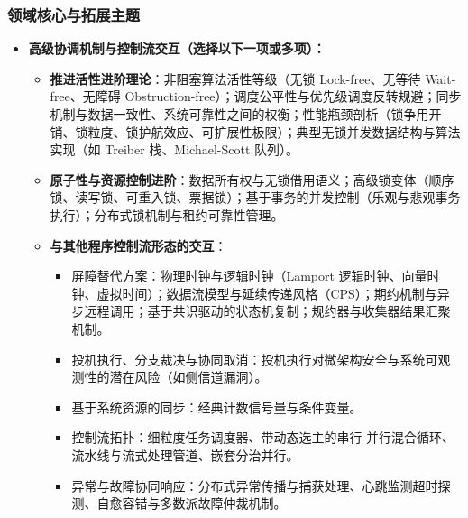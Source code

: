 \subsubsection{领域核心与拓展主题}
\begin{itemize}
    \item \textbf{高级协调机制与控制流交互（选择以下一项或多项）：}
    \begin{itemize}
        \item \textbf{推进活性进阶理论}：非阻塞算法活性等级（无锁 Lock-free、无等待 Wait-free、无障碍 Obstruction-free）；调度公平性与优先级调度反转规避；同步机制与数据一致性、系统可靠性之间的权衡；性能瓶颈剖析（锁争用开销、锁粒度、锁护航效应、可扩展性极限）；典型无锁并发数据结构与算法实现（如 Treiber 栈、Michael-Scott 队列）。
        \item \textbf{原子性与资源控制进阶}：数据所有权与无锁借用语义；高级锁变体（顺序锁、读写锁、可重入锁、票据锁）；基于事务的并发控制（乐观与悲观事务执行）；分布式锁机制与租约可靠性管理。
        \item \textbf{与其他程序控制流形态的交互}：
        \begin{itemize}
            \item 屏障替代方案：物理时钟与逻辑时钟（Lamport 逻辑时钟、向量时钟、虚拟时间）；数据流模型与延续传递风格（CPS）；期约机制与异步远程调用；基于共识驱动的状态机复制；规约器与收集器结果汇聚机制。
            \item 投机执行、分支裁决与协同取消：投机执行对微架构安全与系统可观测性的潜在风险（如侧信道漏洞）。
            \item 基于系统资源的同步：经典计数信号量与条件变量。
            \item 控制流拓扑：细粒度任务调度器、带动态选主的串行-并行混合循环、流水线与流式处理管道、嵌套分治并行。
            \item 异常与故障协同响应：分布式异常传播与捕获处理、心跳监测超时探测、自愈容错与多数派故障仲裁机制。
        \end{itemize}
    \end{itemize}
\end{itemize}


